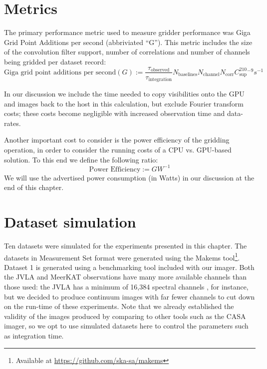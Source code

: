 \section{Metrics}
The primary performance metric used to measure gridder performance was Giga Grid Point Additions per second (abbriviated ``G''). This metric includes the size of the
convolution filter support, number of correlations and number of channels being gridded per dataset record:
\begin{equation}
 \text{Giga grid point additions per second} (G) := \frac{\tau_\text{observed}}{\tau_\text{integration}}N_\text{baselines}N_\text{channel}N_\text{corr}C_\text{sup}^210^{-9}s^{-1}
\end{equation}

In our discussion we include the time needed to copy visibilities onto the GPU and images back to the host in this calculation, 
but exclude Fourier transform costs; these costs become negligible with increased observation time and data-rates.

Another important cost to consider is the power efficiency of the gridding operation, in order to consider the running costs of a CPU vs. GPU-based solution.
To this end we define the following ratio:
\begin{equation}
 \text{Power Efficiency} := GW^{-1}
\end{equation}
We will use the advertised power consumption (in Watts) in our discussion at the end of this chapter.

\section{Dataset simulation}
Ten datasets were simulated for the experiments presented in this chapter. The datasets in Measurement Set format were generated using the Makems tool\footnote{Available at
\url{https://github.com/ska-sa/makems}}. Dataset 1 is generated using a benchmarking tool included with our imager. Both the JVLA and MeerKAT observations
have many more available channels than those used: the JVLA has a minimum of 16,384 spectral channels \cite{2041-8205-739-1-L1}, for instance, but we decided to produce
continuum images with far fewer channels to cut down on the run-time of these experiments. Note that we already established the validity of the images
produced by comparing to other tools such as the CASA imager, so we opt to use simulated datasets here to control the parameters such as integration time.

